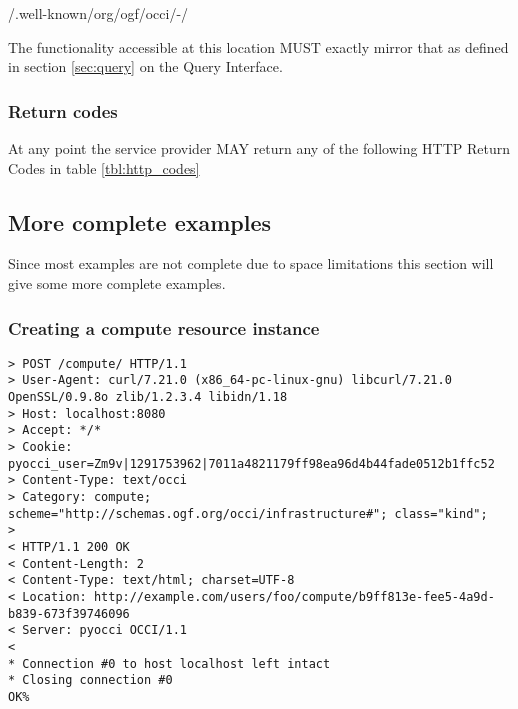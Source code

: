 \documentclass[10pt,a4paper]{article}
\begin{document}
/.well-known/org/ogf/occi/-/

The functionality accessible at this location MUST exactly mirror that
as defined in section \ref{sec:query} on the Query Interface.

\subsubsection{Return codes}
\label{sec:return_codes}
At any point the service provider MAY return any of the following HTTP
Return Codes in table \ref{tbl:http_codes}


%
%

\subsection{More complete examples}
Since most examples are not complete due to space limitations this
section will give some more complete examples.

\subsubsection{Creating a compute resource instance}
\begin{verbatim}
> POST /compute/ HTTP/1.1
> User-Agent: curl/7.21.0 (x86_64-pc-linux-gnu) libcurl/7.21.0 OpenSSL/0.9.8o zlib/1.2.3.4 libidn/1.18
> Host: localhost:8080
> Accept: */*
> Cookie: pyocci_user=Zm9v|1291753962|7011a4821179ff98ea96d4b44fade0512b1ffc52
> Content-Type: text/occi
> Category: compute; scheme="http://schemas.ogf.org/occi/infrastructure#"; class="kind";
> 
< HTTP/1.1 200 OK
< Content-Length: 2
< Content-Type: text/html; charset=UTF-8
< Location: http://example.com/users/foo/compute/b9ff813e-fee5-4a9d-b839-673f39746096
< Server: pyocci OCCI/1.1
< 
* Connection #0 to host localhost left intact
* Closing connection #0
OK% 
\end{verbatim}
\end{document}
